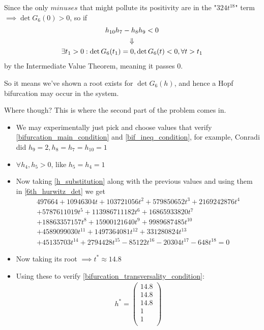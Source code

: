Since the only $minuses$ that might pollute its positivity are in the "$324 t^{18}$" term $\implies \det G_6(0) > 0$, so if
\begin{gather}\label{bif_ineq_condition}
	h_{10}h_{7} - h_{8}h_{9} < 0 \\
	\Downarrow \notag \\
	\exists t_1 > 0 : \det G_6(t_1) = 0, \det G_6(t) < 0, \forall t > t_1 \notag
\end{gather}
by the Intermediate Value Theorem, meaning it passes $0$.

So it means we've shown a root exists for $\det G_6(h)$, and hence a Hopf bifurcation may occur in the system.

Where though? This is where the second part of the problem comes in.

\begin{itemize}
	\item {} We may experimentally just pick and choose values that verify	\ref{bifurcation_main_condition} and \ref{bif_ineq_condition}, for example, Conradi \cite{conradi2024} did $ h_9 = 2, h_8 = h_7 = h_{ 10 } = 1$
	\item {} $\forall h_4, h_5 > 0$, like $h_5 = h_4 = 1$
	\item {} Now taking \ref{h_substitution} along with the previous values and using them in \ref{6th_hurwitz_det} we get
		\begin{gather*}
			497664+10946304t+103721056t^{2}+579850652t^{3}+2169242876t^{4} \\
			+5787611019t^{5}+113986711182t^{6}+16865933820t^{7} \\
			+18863357157t^{8}+15900121640t^{9}+9989687485t^{10} \\
			+4589099030t^{11}+1497364081t^{12}+331280824t^{13} \\
			+45135703t^{14}+2794428t^{15}-85122t^{16}-20304t^{17}-648t^{18}=0	
		\end{gather*}
	\item {} Now taking its root $\implies t^* \approx 14.8$
	\item {} Using these to verify \ref{bifurcation_transversality_condition}:
		\begin{align*}
			h^* =
			\begin{pmatrix}
				14.8 \\
				14.8 \\
				14.8 \\
				1 \\
				1 \\

\end{pmatrix}
\end{align*}
\end{itemize}
